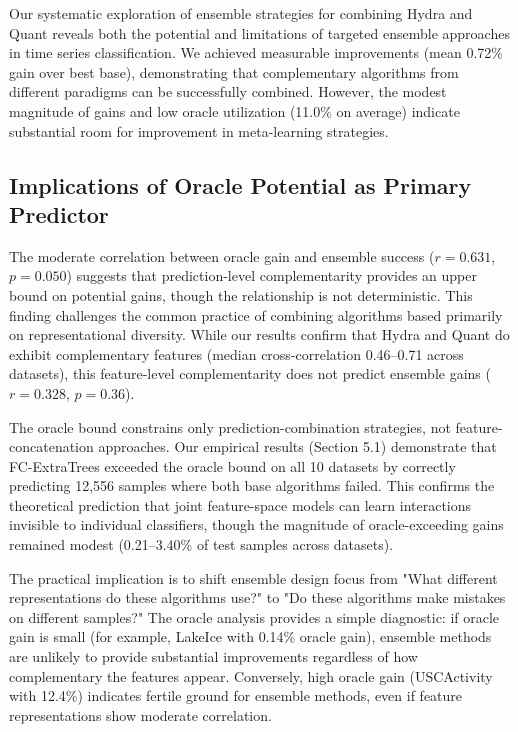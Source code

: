 \documentclass[pdflatex,sn-basic]{sn-jnl}           %
\theoremstyle{thmstyleone}%
\theoremstyle{thmstyletwo}%
\theoremstyle{thmstylethree}%
\begin{document}
Our systematic exploration of ensemble strategies for combining Hydra and Quant reveals both the potential and limitations of targeted ensemble approaches in time series classification. We achieved measurable improvements (mean 0.72\% gain over best base), demonstrating that complementary algorithms from different paradigms can be successfully combined. However, the modest magnitude of gains and low oracle utilization (11.0\% on average) indicate substantial room for improvement in meta-learning strategies.

\subsection{Implications of Oracle Potential as Primary Predictor}

The moderate correlation between oracle gain and ensemble success ($r=0.631$, $p=0.050$) suggests that prediction-level complementarity provides an upper bound on potential gains, though the relationship is not deterministic. This finding challenges the common practice of combining algorithms based primarily on representational diversity. While our results confirm that Hydra and Quant do exhibit complementary features (median cross-correlation 0.46--0.71 across datasets), this feature-level complementarity does not predict ensemble gains ($r=0.328$, $p=0.36$).

The oracle bound constrains only prediction-combination strategies, not feature-concatenation approaches. Our empirical results (Section 5.1) demonstrate that FC-ExtraTrees exceeded the oracle bound on all 10 datasets by correctly predicting 12,556 samples where both base algorithms failed. This confirms the theoretical prediction that joint feature-space models can learn interactions invisible to individual classifiers, though the magnitude of oracle-exceeding gains remained modest (0.21--3.40\% of test samples across datasets).

The practical implication is to shift ensemble design focus from "What different representations do these algorithms use?" to "Do these algorithms make mistakes on different samples?" The oracle analysis provides a simple diagnostic: if oracle gain is small (for example, LakeIce with 0.14\% oracle gain), ensemble methods are unlikely to provide substantial improvements regardless of how complementary the features appear. Conversely, high oracle gain (USCActivity with 12.4\%) indicates fertile ground for ensemble methods, even if feature representations show moderate correlation.
\end{document}
